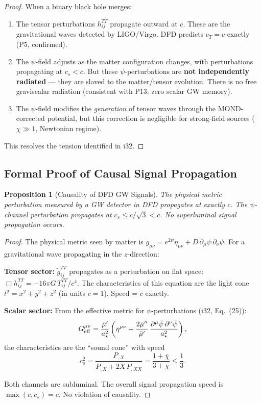 \documentclass[11pt,a4paper]{article}
\newtheorem{proposition}{Proposition}
\begin{document}
\begin{proof}
When a binary black hole merges:
\begin{enumerate}
\item The tensor perturbations $h_{ij}^{TT}$ propagate outward at $c$. These are the gravitational waves detected by LIGO/Virgo. DFD predicts $c_T = c$ exactly (P5, confirmed).
\item The $\psi$-field adjusts as the matter configuration changes, with perturbations propagating at $c_s < c$. But these $\psi$-perturbations are \textbf{not independently radiated} --- they are slaved to the matter/tensor evolution. There is no free graviscalar radiation (consistent with P13: zero scalar GW memory).
\item The $\psi$-field modifies the \emph{generation} of tensor waves through the MOND-corrected potential, but this correction is negligible for strong-field sources ($\chi \gg 1$, Newtonian regime).
\end{enumerate}

This resolves the tension identified in i32.
\end{proof}

\subsection{Formal Proof of Causal Signal Propagation}

\begin{proposition}[Causality of DFD GW Signals]
\label{prop:causality}
The physical metric perturbation measured by a GW detector in DFD propagates at exactly $c$. The $\psi$-channel perturbation propagates at $c_s \leq c/\sqrt{3} < c$. No superluminal signal propagation occurs.
\end{proposition}

\begin{proof}
The physical metric seen by matter is $\tilde{g}_{\mu\nu} = e^{2\psi}\eta_{\mu\nu} + D\,\partial_\mu\psi\,\partial_\nu\psi$. For a gravitational wave propagating in the $z$-direction:

\textbf{Tensor sector:} $\tilde{g}_{ij}^{TT}$ propagates as a perturbation on flat space: $\Box h_{ij}^{TT} = -16\pi G\,T_{ij}^{TT}/c^4$. The characteristics of this equation are the light cone $t^2 = x^2 + y^2 + z^2$ (in units $c=1$). Speed = $c$ exactly.

\textbf{Scalar sector:} From the effective metric for $\psi$-perturbations (i32, Eq.~(25)):
\begin{equation}
G_{\rm eff}^{\mu\nu} = \frac{\bar\mu'}{a_\star^2}\left(\eta^{\mu\nu} + \frac{2\bar\mu''}{\bar\mu'}\,\frac{\partial^\mu\bar\psi\,\partial^\nu\bar\psi}{a_\star^2}\right),
\end{equation}
the characteristics are the ``sound cone'' with speed
\begin{equation}
c_s^2 = \frac{P_{,X}}{P_{,X} + 2\bar{X}\,P_{,XX}} = \frac{1+\bar\chi}{3+\bar\chi} \leq \frac{1}{3}.
\end{equation}

Both channels are subluminal. The overall signal propagation speed is $\max(c, c_s) = c$. No violation of causality.
\end{proof}
\end{document}
